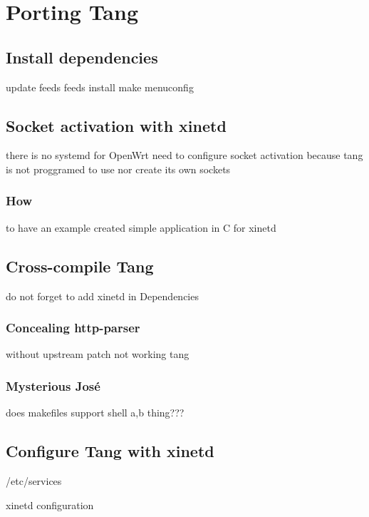 \chapter{Porting Tang}\label{porting-tang}

\section{Install dependencies}

update feeds
feeds install
make menuconfig
\newpage

\section{Socket activation with xinetd}

there is no systemd for OpenWrt
need to configure socket activation because tang is not proggramed to use nor create its own sockets
\subsection{How }

to have an example created simple application in C for xinetd
\newpage

\section{Cross-compile Tang}

do not forget to add xinetd in Dependencies
\newpage

\subsection{Concealing http-parser}

without upstream patch not working tang
\newpage

\subsection{Mysterious José}

does makefiles support shell {a,b} thing???
\newpage

\section{Configure Tang with xinetd}

/etc/services

xinetd configuration

